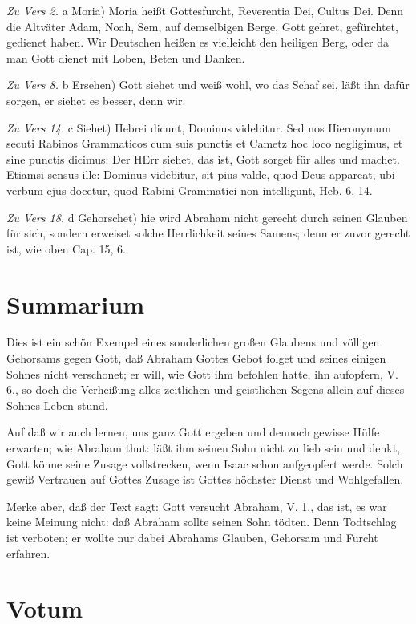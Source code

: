 \emph{Zu Vers 2.} a Moria) Moria heißt Gottesfurcht, Reverentia Dei, Cultus Dei. Denn die Altväter Adam, Noah, Sem, auf demselbigen Berge, Gott gehret, gefürchtet, gedienet haben. Wir Deutschen heißen es vielleicht den heiligen Berg, oder da man Gott dienet mit Loben, Beten und Danken.

\emph{Zu Vers 8.} b Ersehen) Gott siehet und weiß wohl, wo das Schaf sei, läßt ihn dafür sorgen, er siehet es besser, denn wir.

\emph{Zu Vers 14.} c Siehet) Hebrei dicunt, Dominus videbitur. Sed nos Hieronymum secuti Rabinos Grammaticos cum suis punctis et Cametz hoc loco negligimus, et sine punctis dicimus: Der HErr siehet, das ist, Gott sorget für alles und machet. Etiamsi sensus ille: Dominus videbitur, sit pius valde, quod Deus appareat, ubi verbum ejus docetur, quod Rabini Grammatici non intelligunt, Heb. 6, 14.

\emph{Zu Vers 18.} d Gehorschet) hie wird Abraham nicht gerecht durch seinen Glauben für sich, sondern erweiset solche Herrlichkeit seines Samens; denn er zuvor gerecht ist, wie oben Cap. 15, 6.

\section{Summarium}

Dies ist ein schön Exempel eines sonderlichen großen Glaubens und völligen Gehorsams gegen Gott, daß Abraham Gottes Gebot folget und seines einigen Sohnes nicht verschonet; er will, wie Gott ihm befohlen hatte, ihn aufopfern, V. 6., so doch die Verheißung alles zeitlichen und geistlichen Segens allein auf dieses Sohnes Leben stund.

Auf daß wir auch lernen, uns ganz Gott ergeben und dennoch gewisse Hülfe erwarten; wie Abraham thut: läßt ihm seinen Sohn nicht zu lieb sein und denkt, Gott könne seine Zusage vollstrecken, wenn Isaac schon aufgeopfert werde. Solch gewiß Vertrauen auf Gottes Zusage ist Gottes höchster Dienst und Wohlgefallen.

Merke aber, daß der Text sagt: Gott versucht Abraham, V. 1., das ist, es war keine Meinung nicht: daß Abraham sollte seinen Sohn tödten. Denn Todtschlag ist verboten; er wollte nur dabei Abrahams Glauben, Gehorsam und Furcht erfahren.

\section{Votum}

